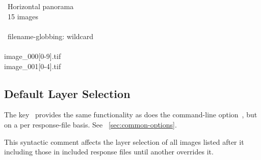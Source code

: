\begin{exemplar}
  \begin{literal}
    ~Horizontal panorama \\
    ~15 images \\
    \mbox{} \\
    ~filename-globbing: wildcard \\
    \mbox{} \\
    image\_000[0-9].tif \\
    image\_001[0-4].tif \\
  \end{literal}

  \caption[Filename-globbing syntactic comment]%
          {\label{ex:globbing-algorithm}%
            Control filename-globbing in a response file with a syntactic comment.}
\end{exemplar}


\subsection[Default Layer Selection]{\label{sec:default-layer-selection}%
  Default Layer Selection}

The key~ provides the same functionality as does the
command\hyp{}line option~, but on a per response\hyp{}file basis.  See
\sectionName~\ref{sec:common-options}.

This syntactic comment affects the layer selection of all images listed after it including those
in included response files until another  overrides it.



